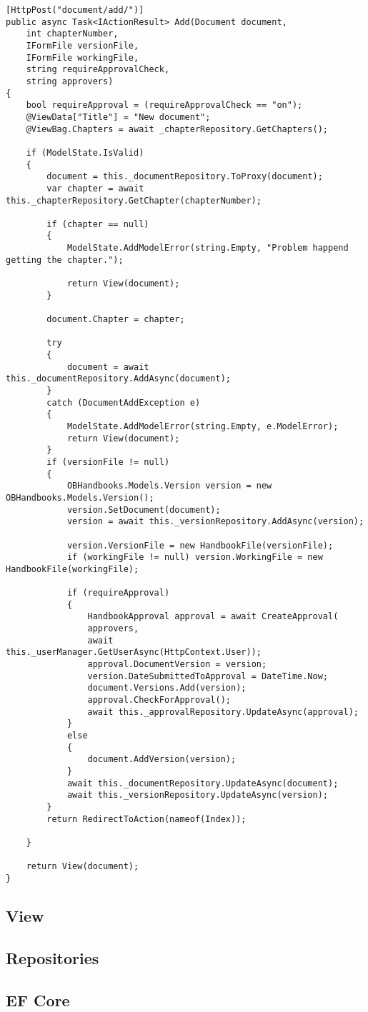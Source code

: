 \begin{lstlisting}
[HttpPost("document/add/")]
public async Task<IActionResult> Add(Document document,
	int chapterNumber,
	IFormFile versionFile,
	IFormFile workingFile,
	string requireApprovalCheck,
	string approvers)
{
	bool requireApproval = (requireApprovalCheck == "on");
	@ViewData["Title"] = "New document";
	@ViewBag.Chapters = await _chapterRepository.GetChapters();

	if (ModelState.IsValid)
	{
		document = this._documentRepository.ToProxy(document);
		var chapter = await this._chapterRepository.GetChapter(chapterNumber);

		if (chapter == null)
		{
			ModelState.AddModelError(string.Empty, "Problem happend getting the chapter.");

			return View(document);
		}

		document.Chapter = chapter;

		try
		{
			document = await this._documentRepository.AddAsync(document);
		}
		catch (DocumentAddException e)
		{
			ModelState.AddModelError(string.Empty, e.ModelError);
			return View(document);
		}
		if (versionFile != null)
		{
			OBHandbooks.Models.Version version = new OBHandbooks.Models.Version();
			version.SetDocument(document);
			version = await this._versionRepository.AddAsync(version);

			version.VersionFile = new HandbookFile(versionFile);
			if (workingFile != null) version.WorkingFile = new HandbookFile(workingFile);

			if (requireApproval)
			{
				HandbookApproval approval = await CreateApproval(
				approvers,
				await this._userManager.GetUserAsync(HttpContext.User));
				approval.DocumentVersion = version;
				version.DateSubmittedToApproval = DateTime.Now;
				document.Versions.Add(version);
				approval.CheckForApproval();
				await this._approvalRepository.UpdateAsync(approval);
			}
			else
			{
				document.AddVersion(version);
			}
			await this._documentRepository.UpdateAsync(document);
			await this._versionRepository.UpdateAsync(version);
		}
		return RedirectToAction(nameof(Index));

	}

	return View(document);
}

\end{lstlisting}

\subsection{View}

\subsection{Repositories}

\subsection{EF Core}
